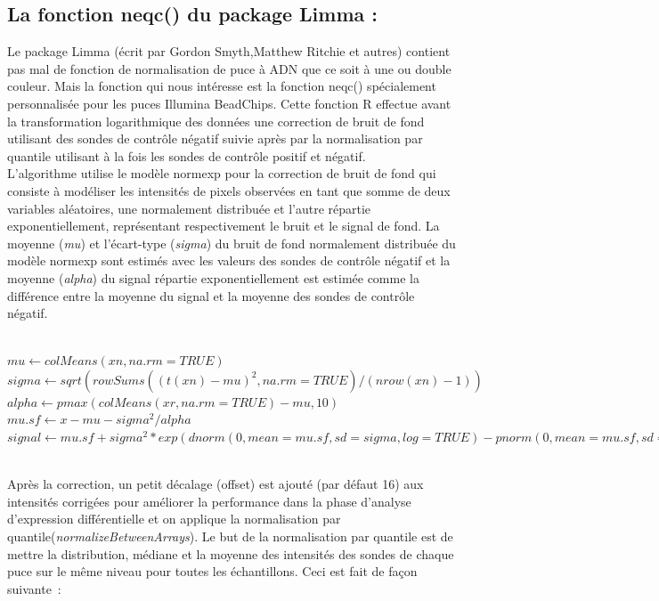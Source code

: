 \documentclass[a4paper,10pt]{article}
\begin{document}
\subsection{La fonction neqc() du package Limma :}
Le package Limma (écrit par Gordon Smyth,Matthew Ritchie et autres) contient pas mal de fonction de normalisation de puce à ADN que ce soit à une ou double couleur. Mais la fonction qui nous intéresse est la fonction neqc() spécialement personnalisée pour les puces Illumina BeadChips.
Cette fonction R effectue avant la transformation logarithmique des données une correction de bruit de fond utilisant des sondes de contrôle négatif suivie après par la normalisation par quantile utilisant à la fois les sondes de contrôle positif et négatif.
\\L’algorithme utilise le modèle \textgravedbl normexp \textacutedbl\cite{silver2009microarray} pour la correction de bruit de fond qui consiste à modéliser les intensités de pixels observées en tant que somme de deux variables aléatoires, une normalement distribuée et l’autre répartie exponentiellement, représentant respectivement le bruit et le signal de fond. 
La moyenne (\emph{mu}) et l’écart-type (\emph{sigma}) du bruit de fond normalement distribuée du modèle normexp sont estimés avec les valeurs des sondes de contrôle négatif et  la moyenne (\emph{alpha}) du signal répartie exponentiellement est estimée comme la différence entre la moyenne du signal et la moyenne des sondes de contrôle négatif.
\begin{scriptsize}
 \\$mu \leftarrow colMeans(xn, na.rm = TRUE)$
 \\$sigma \leftarrow sqrt(rowSums((t(xn) - mu)^2, na.rm = TRUE)/(nrow(xn) - 1))$
 \\$alpha \leftarrow pmax(colMeans(xr, na.rm = TRUE) - mu, 10)$
 \\$mu.sf \leftarrow x - mu - sigma^2/alpha$
 \\$signal \leftarrow mu.sf + sigma^2 * exp(dnorm(0, mean = mu.sf, sd = sigma, log = TRUE) - pnorm(0, mean = mu.sf, sd = sigma, lower.tail = FALSE, log.p = TRUE))$
\end{scriptsize}
\\Après la correction, un petit décalage (offset) est ajouté (par défaut 16) aux intensités corrigées pour  améliorer la performance dans la phase d’analyse d’expression différentielle et on applique la normalisation par quantile(\emph{normalizeBetweenArrays}).
Le but de la normalisation par quantile est de mettre la distribution, médiane et la moyenne des intensités des sondes de chaque puce sur le même niveau pour toutes les échantillons. Ceci est fait de façon suivante :
\end{document}

